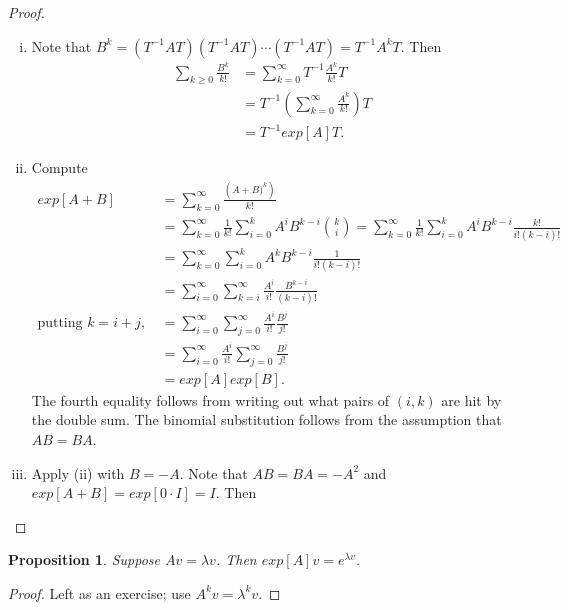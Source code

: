 \documentclass{tufte-handout}
\newtheorem{prop}[thm]{Proposition}
\theoremstyle{definition}
\begin{document}
\begin{proof}
	\begin{enumerate}[(i)]
		\item Note that $B^k = (T^{-1}AT)(T^{-1}AT)\cdots(T^{-1}AT)= T^{-1}A^k T$. Then 
			\begin{align*}
				\sum\limits_{k\ge 0}^{} \frac{B^k}{k!} &=  \sum\limits_{k=0}^{\infty} T^{-1} \frac{A^k}{k!}T \\
				&= T^{-1} \left( \sum\limits_{k=0}^{\infty} \frac{A^k}{k!} \right)T  \\
				&= T^{-1} exp[A] T
			.\end{align*}
		\item Compute
			\begin{align*}
				exp[A+B] &= \sum\limits_{k=0}^{\infty} \frac{\left( A+B)^{k} \right)}{k!} \\
						 &= \sum\limits_{k=0}^{\infty} \frac{1}{k!} \sum\limits_{i=0}^{k} A^i B^{k-i} \binom{k}{i} = \sum\limits_{k=0}^{\infty} \frac{1}{k!} \sum\limits_{i=0}^{k} A^i B^{k-i} \frac{k!}{i! (k-i)!} \\
						 &= \sum\limits_{k=0}^{\infty} \sum\limits_{i=0}^{k} A^k B^{k-i} \frac{1}{i! (k-i)!} \\
						 &= \sum\limits_{i=0}^{\infty} \sum\limits_{k=i}^{\infty} \frac{A^i}{i!} \frac{B^{k-i}}{(k-i)!} \\
						\text{putting $k = i+j$, } &= \sum\limits_{i=0}^{\infty} \sum\limits_{j=0}^{\infty} \frac{A^i}{i!} \frac{B^j}{j!} \\
						&= \sum\limits_{i=0}^{\infty} \frac{A^i}{i!} \sum\limits_{j=0}^{\infty} \frac{B^j}{j!} \\
						&= exp[A] exp[B]
			.\end{align*}
			The fourth equality follows from writing out what pairs of $(i,k)$ are hit by the double sum. The binomial substitution follows from the assumption that $AB = BA$.
		\item Apply (ii) with $B = -A$. Note that $AB = BA = -A^2$ and $exp[A+B] = exp[0\cdot I] = I$.
			Then 
	\end{enumerate}
\end{proof}

\begin{prop} \label{prop:10-21-1}
	Suppose $Av = \lambda v$. Then $exp[A]v = e^{\lambda v}$.
\end{prop}
\begin{proof}
	Left as an exercise; use $A^k v = \lambda^k v$.
\end{proof}
\end{document}
